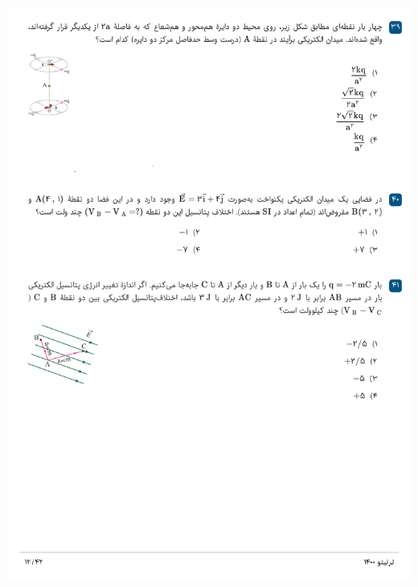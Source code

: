 \documentclass{book}
\begin{document}
\includegraphics[width=\textwidth]{"pages/12"}
\end{document}
